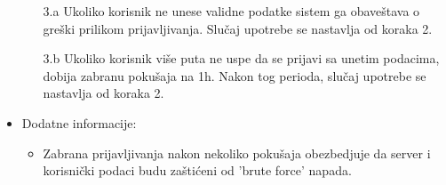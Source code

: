 \begin{itemize}
\begin{itemize}
			\item[3.a] Ukoliko korisnik ne unese validne podatke sistem ga obaveštava o greški prilikom prijavljivanja. Slučaj upotrebe se nastavlja od koraka 2.
            \item[3.b] Ukoliko korisnik više puta ne uspe da se prijavi sa unetim podacima, dobija zabranu pokušaja na 1h. Nakon tog perioda, slučaj upotrebe se nastavlja od koraka 2.
        \end{itemize}
    \item Dodatne informacije:
        \begin{itemize}
            \item Zabrana prijavljivanja nakon nekoliko pokušaja obezbedjuje da server i korisnički podaci budu zaštićeni od 'brute force' napada.
        \end{itemize}
\end{itemize}
